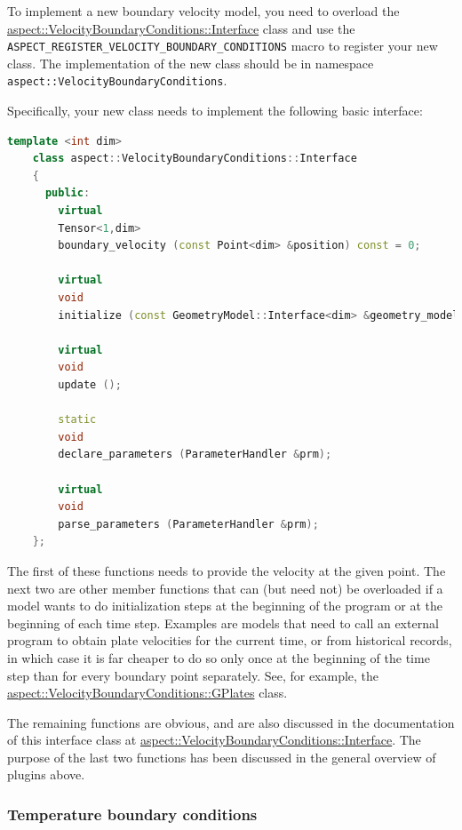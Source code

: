 \documentclass{article}
\begin{document}
To implement a new boundary velocity model, you
need to overload the
\href{doc/doxygen/classaspect_1_1VelocityBoundaryConditions_1_1Interface.html}{aspect::VelocityBoundaryConditions::Interface}
class and use
the \texttt{ASPECT\_REGISTER\_VELOCITY\_BOUNDARY\_CONDITIONS} macro to
register your new class. The implementation of the new class should be in namespace
\texttt{aspect::VelocityBoundaryConditions}.

Specifically, your new class needs to implement the following basic interface:
\begin{lstlisting}[frame=single,language=C++]
    template <int dim>
    class aspect::VelocityBoundaryConditions::Interface
    {
      public:
        virtual
        Tensor<1,dim>
        boundary_velocity (const Point<dim> &position) const = 0;

        virtual
        void
        initialize (const GeometryModel::Interface<dim> &geometry_model);

        virtual
        void
        update ();

        static
        void
        declare_parameters (ParameterHandler &prm);

        virtual
        void
        parse_parameters (ParameterHandler &prm);
    };
\end{lstlisting}
The first of these functions needs to provide the velocity at the
given point. The next two are other member functions that can
(but need not) be overloaded if a model wants to do initialization steps at the
beginning of the program or at the beginning of each time step. Examples are
models that need to call an external program to obtain plate velocities for the
current time, or from historical records, in which case it is far cheaper to do
so only once at the beginning of the time step than for every boundary point
separately. See, for example, the 
\href{doc/doxygen/classaspect_1_1VelocityBoundaryConditions_1_1GPlates.html}{aspect::VelocityBoundaryConditions::GPlates}
class.

The remaining functions are obvious, and are also
discussed in the documentation of this interface class at
\href{doc/doxygen/classaspect_1_1VelocityBoundaryConditions_1_1Interface.html}{aspect::VelocityBoundaryConditions::Interface}.
The purpose
of the last two functions has been discussed in the general overview of
plugins above.


\subsubsection{Temperature boundary conditions}
\label{sec:temperature-boundary-conditions}
\end{document}

